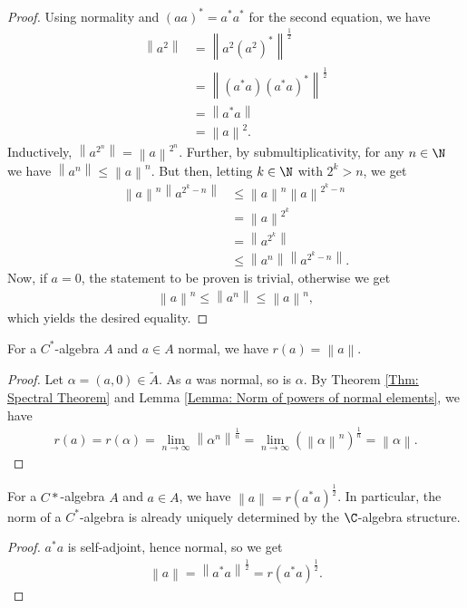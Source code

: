 \documentclass[american]{scrartcl}
\renewcommand{\norm}[1]{\left\lVert #1 \right\rVert}
\begin{document}
\begin{proof}
	Using normality and $(aa)^*=a^*a^*$ for the second equation, we have
	\begin{align*}
		\norm{a^2}&=\norm{a^2\left(a^2\right)^*}^{\frac{1}{2}}\\
		&=\norm{(a^*a)(a^*a)^*}^{\frac{1}{2}}\\
		&=\norm{a^*a}\\
		&=\norm{a}^2.
	\end{align*}
	Inductively, $\norm{a^{2^n}}=\norm{a}^{2^n}$. Further, by submultiplicativity, for any $n\in \N$ we have $\norm{a^n}\leq \norm{a}^n$. But then, letting $k\in \N$ with $2^k>n$, we get
	\begin{align*}
		\norm{a}^n\norm{a^{2^k-n}}&\leq \norm{a}^n\norm{a}^{2^k-n}\\
		&=\norm{a}^{2^k}\\
		&=\norm{a^{2^k}}\\
		&\leq \norm{a^n}\norm{a^{2^k-n}}.
	\end{align*}
	Now, if $a=0$, the statement to be proven is trivial, otherwise we get
	\begin{align*}
		\norm{a}^n\leq \norm{a^n}\leq\norm{a}^n,
	\end{align*}
	which yields the desired equality.
\end{proof}
\begin{corollary}
	For a $C^*$-algebra $A$ and $a\in A$ normal, we have $r(a)=\norm{a}$.
\end{corollary}
\begin{proof}
	Let $\alpha=(a,0)\in \tilde{A}$. As $a$ was normal, so is $\alpha$. By Theorem \ref{Thm: Spectral Theorem} and Lemma \ref{Lemma: Norm of powers of normal elements}, we have
	\begin{align*}
		r(a)=r(\alpha)=\lim_{n\to\infty}\norm{\alpha^n}^{\frac{1}{n}}=\lim_{n\to\infty}\left(\norm{\alpha}^n\right)^{\frac{1}{n}}=\norm{\alpha}.
	\end{align*}
\end{proof}
\begin{corollary}
	For a $C*$-algebra $A$ and $a\in A$, we have $\norm{a}=r(a^*a)^{\frac{1}{2}}$. In particular, the norm of a $C^*$-algebra is already uniquely determined by the $\C$-algebra structure.
\end{corollary}
\begin{proof}
	$a^*a$ is self-adjoint, hence normal, so we get
	\begin{align*}
		\norm{a}=\norm{a^*a}^{\frac{1}{2}}=r(a^*a)^{\frac{1}{2}}.
	\end{align*}
\end{proof}
\end{document}
